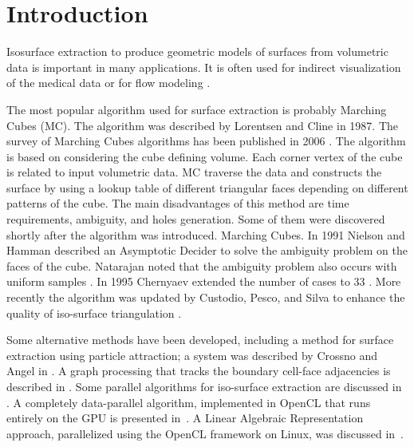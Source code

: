 \section{Introduction}\label{sec:intro}


Isosurface extraction to produce geometric models of surfaces from volumetric data is important in many applications. It is often used for indirect visualization of the medical data or for flow modeling \cite{Rohan2018a}. 
 
The most popular algorithm used for surface extraction is probably Marching Cubes (MC). The algorithm was described by Lorentsen and Cline \cite{Lorensen1987} in 1987. The survey of Marching Cubes algorithms has been published in 2006 \cite{Newman2006}. The algorithm is based on considering the cube defining volume. Each corner vertex of the cube is related to input volumetric data. MC traverse the data and constructs the surface by using a lookup table of different triangular faces depending on different patterns of the cube.  The main disadvantages of this method are time requirements, ambiguity, and holes generation. Some of them were discovered shortly after the algorithm was introduced. 
Marching Cubes. In 1991 Nielson and Hamman described an Asymptotic Decider to solve the ambiguity problem on the faces of the cube.  Natarajan noted that the ambiguity problem also occurs with uniform samples \cite{Natarajan1994}. In 1995 Chernyaev extended the number of cases to 33 \cite{chernyaev1995marching}. More recently the algorithm was updated by Custodio, Pesco, and Silva to enhance the quality of iso-surface triangulation \cite{Custodio2019}. 

Some alternative methods have been developed, including a method for surface extraction using particle attraction; a system was described by Crossno and Angel in \cite{Crossno1997}. A graph processing that tracks the boundary cell-face adjacencies is described in \cite{Lachaud2000}. Some parallel algorithms for iso-surface extraction are discussed in \cite{Bajaj2004}.
A completely data-parallel algorithm, implemented in OpenCL that runs entirely on the GPU is presented in~\cite{Smistad12}. 
A Linear Algebraic Representation approach, parallelized using the OpenCL framework on Linux, was discussed in~\cite{paodcvjcadanda2015}.


